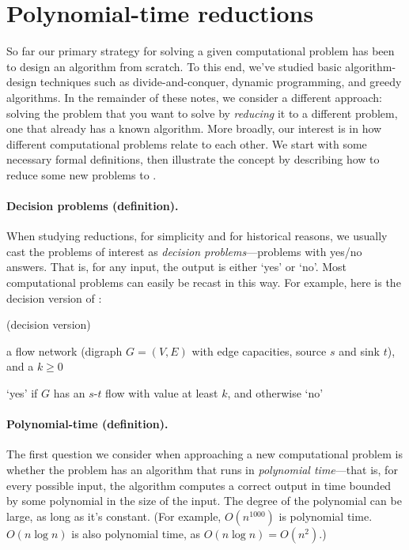 
\section{Polynomial-time reductions}\label{flow: sec: reductions}
So far our primary strategy for solving a given computational problem
has been to design an algorithm from scratch.
To this end, we've studied basic algorithm-design techniques
such as divide-and-conquer, dynamic programming, and greedy algorithms.
In the remainder of these notes, we consider a different approach:
solving the problem that you want to solve by \emph{reducing} it to a different problem,
one that already has a known algorithm.
More broadly, our interest is in how different computational problems relate to each other.
We start with some necessary formal definitions,
then illustrate the concept by describing how to reduce some new problems to .

\paragraph{Decision problems (definition).} 
When studying reductions, for simplicity and for historical reasons,
we usually cast the problems of interest as \emph{decision problems}---problems with yes/no answers.
That is, for any input, the output is either `\textsf{yes}' or `\textsf{no}'.
Most computational problems can easily be recast in this way.
For example, here is the decision version of :

\begin{mylist}
\item[]  (decision version) \dotfill \em
\item[\bf input:] a flow network (digraph $G=(V,E)$ with edge capacities, source $s$ and sink $t$), and a $k\ge 0$
\item[\bf output:] `\textsf{yes}' if $G$ has an $s$-$t$ flow with value at least $k$, and otherwise `\textsf{no}'
\end{mylist}

\paragraph{Polynomial-time (definition).}
The first question we consider when approaching a new computational problem
is whether the problem has an algorithm that runs in \emph{polynomial time}---that is, for every possible input, the algorithm computes a correct output
in time bounded by some polynomial in the size of the input.
The degree of the polynomial can be large, as long as it's constant.
(For example, $O(n^{1000})$ is polynomial time.  $O(n\log n)$ is also polynomial time,
as $O(n\log n) = O(n^2)$.)

